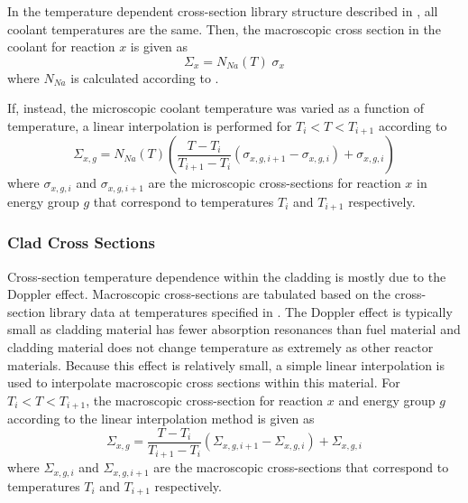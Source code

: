       In the temperature dependent cross-section library structure described in
      , all coolant temperatures are the same. Then, the
      macroscopic cross section in the coolant for reaction $x$ is given as
      \begin{equation}
        \Sigma_x = N_{Na}(T) \; \sigma_x
      \end{equation}
      where $N_{Na}$ is calculated according to .

      If, instead, the microscopic coolant temperature was varied as a function
      of temperature, a linear interpolation is performed for $T_{i}<T<T_{i+1}$
      according to
      \begin{equation}
        \label{eq:cs_cool}
        \Sigma_{x,g} = N_{Na}(T) 
          \left( \frac{T - T_{i}}{T_{i+1}-T_{i}} 
          (\sigma_{x,g,i+1} - \sigma_{x,g,i})  + \sigma_{x,g,i}\right)
      \end{equation}
      where $\sigma_{x,g,i}$ and $\sigma_{x,g,i+1}$ are the microscopic 
      cross-sections for reaction $x$ in energy group $g$ that correspond to 
      temperatures $T_i$ and $T_{i+1}$ respectively.

    \subsubsection{Clad Cross Sections}
      Cross-section temperature dependence within the cladding is mostly due to
      the Doppler effect. Macroscopic cross-sections are tabulated based on the
      cross-section library data at temperatures specified in
      . The Doppler effect is typically small as cladding
      material has fewer absorption resonances than fuel material and cladding
      material does not change temperature as extremely as other reactor
      materials. Because this effect is relatively small, a simple linear
      interpolation is used to interpolate macroscopic cross sections within
      this material. For $T_i < T < T_{i+1}$, the macroscopic cross-section for
      reaction $x$ and energy group $g$ according to the linear interpolation
      method is given as
      \begin{equation}
        \label{eq:xs_linear_interpolation}
        \Sigma_{x,g} = 
          \frac{T - T_{i}}{T_{i+1}-T_{i}} 
          (\Sigma_{x,g,i+1} - \Sigma_{x,g,i})  + \Sigma_{x,g,i}
      \end{equation}
      where $\Sigma_{x,g,i}$ and $\Sigma_{x,g,i+1}$ are the macroscopic
      cross-sections that correspond to temperatures $T_i$ and $T_{i+1}$
      respectively. 

